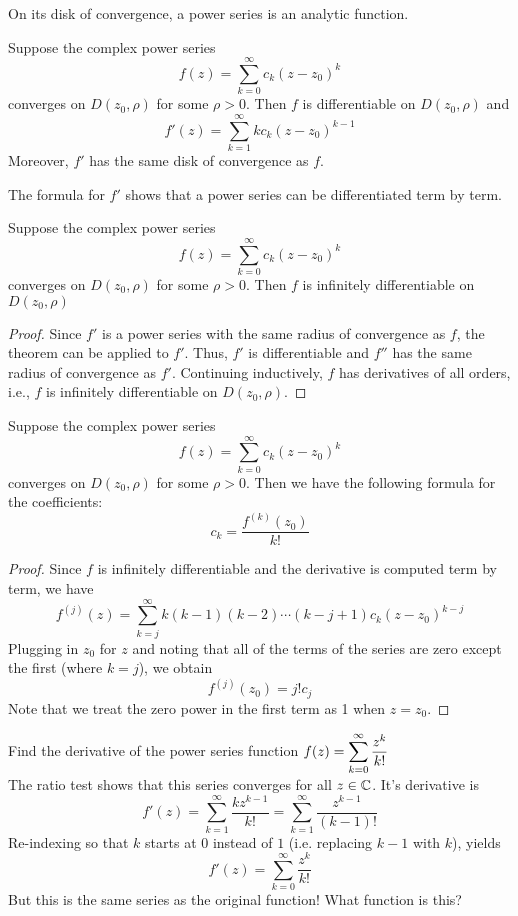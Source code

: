 \documentclass[handout]{ximera}
\begin{document}
On its disk of convergence, a power series is an analytic function.
\begin{theorem}
Suppose the complex power series
\[
f(z) = \sum_{k=0}^\infty c_k(z-z_0)^k
\]
converges on $D(z_0, \rho)$ for some $\rho > 0$.
Then $f$ is differentiable on $D(z_0, \rho)$ and 
\[
f'(z) = \sum_{k=1}^\infty kc_k(z-z_0)^{k-1}
\]
Moreover, $f'$ has the same disk of convergence as $f$.
\end{theorem}
\begin{remark}
The formula for $f'$ shows that a power series can be differentiated term by term.
\end{remark}
\begin{corollary}
Suppose the complex power series
\[
f(z) = \sum_{k=0}^\infty c_k(z-z_0)^k
\]
converges on $D(z_0, \rho)$ for some $\rho > 0$.
Then $f$ is infinitely differentiable on $D(z_0, \rho)$
\end{corollary}

\begin{proof}
Since $f'$ is a power series with the same radius of convergence as $f$, the theorem can be applied to $f'$. Thus,
$f'$ is differentiable and $f''$ has the same radius of convergence as $f'$. Continuing inductively, $f$
has derivatives of all orders, i.e., $f$ is infinitely differentiable on $D(z_0, \rho)$.
\end{proof}

\begin{corollary}
Suppose the complex power series
\[
f(z) = \sum_{k=0}^\infty c_k(z-z_0)^k
\]
converges on $D(z_0, \rho)$ for some $\rho > 0$. Then we have the following formula for the coefficients:
\[
c_k = \frac{f^{(k)}(z_0)}{k!}
\]
\end{corollary}
\begin{proof}
Since $f$ is infinitely differentiable and the derivative is computed term by term, we have
\[
f^{(j)}(z) = \sum_{k=j}^\infty k(k-1)(k-2)\cdots(k-j+1)c_k(z-z_0)^{k-j}
\]
Plugging in $z_0$ for $z$ and noting that all of the terms of the series are zero except the first (where $k = j$),
we obtain
\[
f^{(j)}(z_0) = j!c_j
\]
Note that we treat the zero power in the first term as 1 when $z=z_0$.
\end{proof}

\begin{example}[example 2]
Find the derivative of the power series function $\displaystyle f(z) = \sum_{k=0}^\infty \frac{z^k}{k!}$\\
The ratio test shows that this series converges for all $z \in \mathbb C$. It's derivative is
\[
f'(z) = \sum_{k=1}^\infty\frac{kz^{k-1}}{k!}= \sum_{k=1}^\infty \frac{z^{k-1}}{(k-1)!}
\]
Re-indexing so that $k$ starts at $0$ instead of $1$ (i.e. replacing $k-1$ with $k$), yields
\[
f'(z) = \sum_{k=0}^\infty \frac{z^k}{k!}
\]
But this is the same series as the original function! What function is this?
\end{example}
\end{document}
